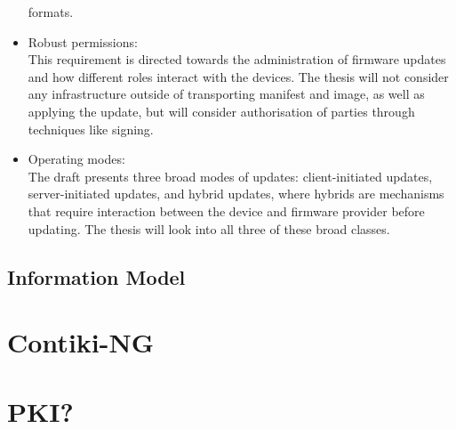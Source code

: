 \documentclass[0-thesis.tex]{subfiles}
\begin{document}
\begin{itemize}
            formats.
    \item Robust permissions:\\
            This requirement is directed towards the administration of firmware updates and 
            how different roles interact with the devices. The thesis will not consider any 
            infrastructure outside of transporting manifest and image, as well as applying 
            the update, but will consider authorisation of parties through techniques like 
            signing.
    \item Operating modes:\\
            The draft presents three broad modes of updates: client-initiated updates, 
            server-initiated updates, and hybrid updates, where hybrids are mechanisms 
            that require interaction between the device and firmware provider before 
            updating. The thesis will look into all three of these broad classes.
\end{itemize}

\subsection{Information Model}

\section{Contiki-NG}

\section{PKI?}
\end{document}
